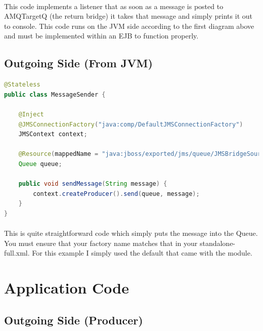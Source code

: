 \documentclass[
10pt, %
letterpaper, %
oneside, %
headinclude,footinclude, %
BCOR5mm, %
]{scrartcl}
\begin{document}
\paragraph{}
This code implements a listener that as soon as a message is posted to AMQTargetQ  (the return bridge) it takes that message and simply prints it out to console. This code runs on the JVM side according to the first diagram above and must be implemented within an EJB to function properly.


\subsection{\textbf{Outgoing Side (From JVM)}}

\begin{lstlisting}[language=Java]
@Stateless
public class MessageSender {

    @Inject
    @JMSConnectionFactory("java:comp/DefaultJMSConnectionFactory")
    JMSContext context;

    @Resource(mappedName = "java:jboss/exported/jms/queue/JMSBridgeSourceQ")
    Queue queue;

    public void sendMessage(String message) {
        context.createProducer().send(queue, message);
    }
}
\end{lstlisting}

\paragraph{}
This is quite straightforward code which simply puts the message into the Queue. You must ensure that your factory name matches that in your standalone-full.xml. For this example I simply used the default that came with the module.



\section{Application Code}


\subsection{\textbf{Outgoing Side (Producer)}}
\end{document}

